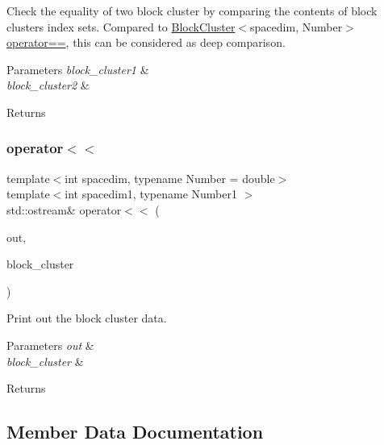 Check the equality of two block cluster by comparing the contents of block cluster\textquotesingle{}s index sets. Compared to {\ttfamily \hyperlink{classBlockCluster}{Block\+Cluster}$<$spacedim}, Number$>$\hyperlink{block__cluster_8h_ac23e3e876ac4316263d9ce0c4f51ad07}{operator==}, this can be considered as deep comparison.


\begin{DoxyParams}{Parameters}
{\em block\+\_\+cluster1} & \\
\hline
{\em block\+\_\+cluster2} & \\
\hline
\end{DoxyParams}
\begin{DoxyReturn}{Returns}

\end{DoxyReturn}
\mbox{\label{classBlockCluster_a9721dfd2e13c7fc896f6f1e9e1c1ed04}} 
\subsubsection{\texorpdfstring{operator$<$$<$}{operator<<}}
{\footnotesize\ttfamily template$<$int spacedim, typename Number = double$>$ \\
template$<$int spacedim1, typename Number1 $>$ \\
std\+::ostream\& operator$<$$<$ (\begin{DoxyParamCaption}\item[{std\+::ostream \&}]{out,  }\item[{const \hyperlink{classBlockCluster}{Block\+Cluster}$<$ spacedim1, Number1 $>$ \&}]{block\+\_\+cluster }\end{DoxyParamCaption})\hspace{0.3cm}{\ttfamily [friend]}}

Print out the block cluster data. 
\begin{DoxyParams}{Parameters}
{\em out} & \\
\hline
{\em block\+\_\+cluster} & \\
\hline
\end{DoxyParams}
\begin{DoxyReturn}{Returns}

\end{DoxyReturn}


\subsection{Member Data Documentation}
\mbox{\label{classBlockCluster_a2b843d0eaae1bf4b49ec82ffcb75e798}} 
